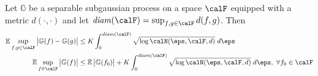 \begin{theorem}
	\label{thm:vdv2.2.4}
	Let \(\mathbb{G}\) be a separable subgaussian process on a space \(\calF\) equipped with a metric  \(d(\cdot,\cdot)\) and let \(\text{\emph{diam}}(\calF) = \sup_{f,g\in\calF}d(f,g) \). Then
	\begin{align}
		\label{eq:vdv2.2.4-1}
		\E\sup_{f,g\in\calF}\left|\mathbb{G}(f)-\mathbb{G}(g)\right|
		&\leq K \int_{0}^{\text{\emph{diam}}(\calF)} \sqrt{\log \calN(\eps, \calF, d)}\;d\eps \\
		\label{eq:vdv2.2.4-2}
		\E\sup_{f\in\calF}\left|\mathbb{G}(f)\right| &\leq \E\left|\mathbb{G}(f_0)\right| + K \int_{0}^{\text{\emph{diam}}(\calF)} \sqrt{\log \calN(\eps, \calF, d)}\;d\eps,\hbox{ }\forall f_0\in\calF
	\end{align}
\end{theorem}

